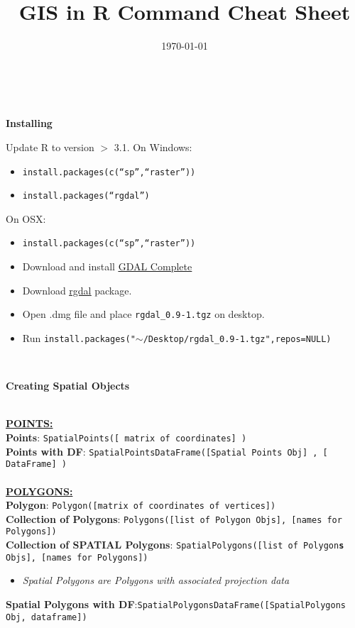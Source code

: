 \documentclass[10pt]{article}
\title{GIS in R Command Cheat Sheet}
\date{\today}
\begin{document}
 
\maketitle
	
\hrulefill \\ 
\centerline{\textbf{Installing}}
Update R to version $>$ 3.1.
On Windows:
\begin{itemize}
	\item \texttt{install.packages(c(``sp'',``raster''))}
	\item \texttt{install.packages(``rgdal'')}
\end{itemize}
On OSX:
	\begin{itemize}
		\item \texttt{install.packages(c(``sp'',``raster''))}
		\item Download and install 	\href{http://www.kyngchaos.com/files/software/frameworks/GDAL_Complete-1.11.dmg}{\underline{GDAL Complete}}
		\item Download \href{http://www.kyngchaos.com/files/software/frameworks/rgdal-0.9.1-1.dmg}{\underline{rgdal}} package. 
		\item Open .dmg file and place \texttt{rgdal\_0.9-1.tgz} on desktop.
		\item Run \texttt{install.packages("$\sim$/Desktop/rgdal\_0.9-1.tgz",repos=NULL)}
	\end{itemize}

\hrulefill \\ 
\centerline{\textbf{Creating Spatial Objects}} \\
\underline{\textbf{POINTS:}}\\
\textbf{Points}: \texttt{SpatialPoints([ matrix of coordinates] )}\\
\textbf{Points with DF}: \texttt{SpatialPointsDataFrame([Spatial Points Obj] , [ DataFrame] )}\\
\\
\underline{\textbf{POLYGONS:}}\\
\textbf{Polygon}: \texttt{Polygon([matrix of coordinates of vertices])}\\
\textbf{Collection of Polygons}: \texttt{Polygons([list of Polygon Objs], [names for Polygons])}\\
\textbf{Collection of SPATIAL Polygons}: \texttt{SpatialPolygons([list of Polygon\textbf{s} Objs], [names for Polygons])}
\begin{itemize}
	\item \emph{Spatial Polygons are Polygons with associated projection data}
\end{itemize}
\textbf{Spatial Polygons with DF}:\texttt{SpatialPolygonsDataFrame([SpatialPolygons Obj, dataframe])}
\end{document}
